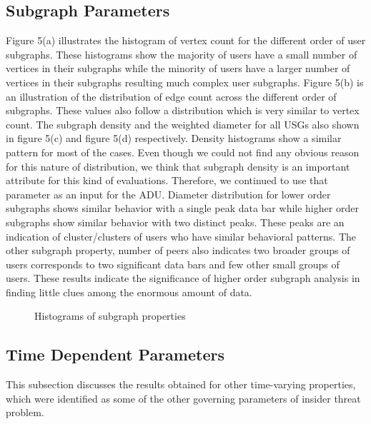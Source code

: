 \documentclass[conference,draftclsnofoot,onecolumn]{IEEEtran}%
\begin{document}
\subsection{Subgraph Parameters}
Figure 5(a) illustrates the histogram of vertex count for the different order of user subgraphs. These histograms show the majority of users have a small number of vertices in their subgraphs while the minority of users have a larger number of vertices in their subgraphs resulting much complex user subgraphs. Figure 5(b) is an illustration of the distribution of edge count across the different order of subgraphs. These values also follow a distribution which is very similar to vertex count. The subgraph density and the weighted diameter for all USGs also shown in figure 5(c) and figure 5(d) respectively. Density histograms show a similar pattern for most of the cases. Even though we could not find any obvious reason for this nature of distribution, we think that subgraph density is an important attribute for this kind of evaluations. Therefore, we continued to use that parameter as an input for the ADU. Diameter distribution for lower order subgraphs shows similar behavior with a single peak data bar while higher order subgraphs show similar behavior with two distinct peaks. These peaks are an indication of cluster/clusters of users who have similar behavioral patterns. The other subgraph property, number of peers also indicates two broader groups of users corresponds to two significant data bars and few other small groups of users. These results indicate the significance of higher order subgraph analysis in finding little clues among the enormous amount of data.
 
\begin{figure*}[h]
		\centering
		\hfil
		\caption{Histograms of subgraph properties}
		\label{figure 5}
		\vspace{-5pt}
\end{figure*}

\subsection{Time Dependent Parameters}
This subsection discusses the results obtained for other time-varying properties, which were identified as some of the other governing parameters of insider threat problem. 
\end{document}
